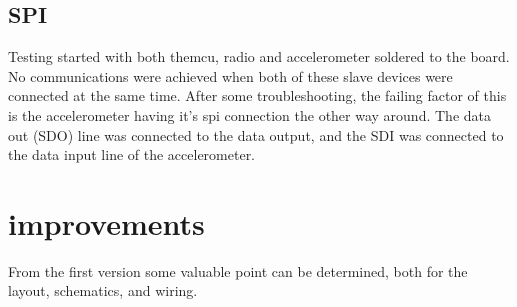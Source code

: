 \subsection{SPI}
Testing started with both the\gls{mcu}, radio and accelerometer soldered to the board. No communications were achieved when both of these slave devices were connected at the same time. After some troubleshooting, the failing factor of this is the accelerometer having it's \gls{spi} connection the other way around. The data out (SDO) line was connected to the data output, and the SDI was connected to the data input line of the accelerometer.  


\section{improvements}
From the first version some valuable point can be determined, both for the layout, schematics, and wiring.

